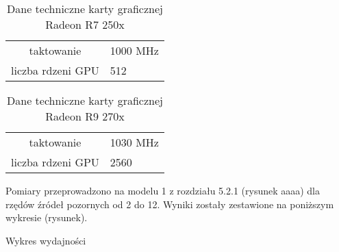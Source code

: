 \begin{table}[h]
        \centering
        \begin{threeparttable}
                \caption{Dane techniczne karty graficznej Radeon R7 250x}\label{tab:table_example}
                \begin{tabularx}{0.6\textwidth}{| c | X |}
                       \midrule
		taktowanie & 1000 MHz \\
                     liczba rdzeni GPU & 512 \\
                        \bottomrule
                \end{tabularx}
        \end{threeparttable}
\end{table}

\begin{table}[h]
        \centering
        \begin{threeparttable}
                \caption{Dane techniczne karty graficznej Radeon R9 270x}\label{tab:table_example}
                \begin{tabularx}{0.6\textwidth}{| c | X |}
                       \midrule
		taktowanie & 1030 MHz \\
                     liczba rdzeni GPU & 2560 \\
                        \bottomrule
                \end{tabularx}
        \end{threeparttable}
\end{table}

Pomiary przeprowadzono na modelu 1 z rozdziału 5.2.1 (rysunek aaaa) dla rzędów źródeł pozornych od 2 do 12. Wyniki zostały zestawione na poniższym wykresie (rysunek).

Wykres wydajności
















